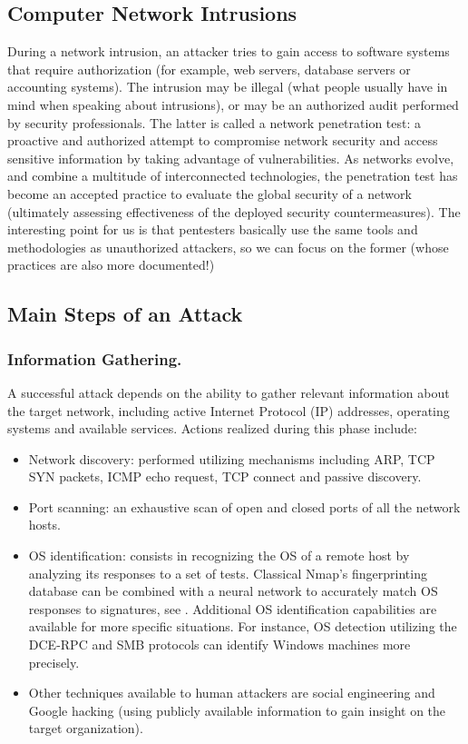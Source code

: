 \documentclass{llncs}
\begin{document}
\subsection{Computer Network Intrusions}

During a network intrusion, an attacker tries to 
gain access to software systems that require authorization
(for example, web servers, database servers or accounting systems).
The intrusion may be illegal (what people usually have in mind when 
speaking about intrusions), or may be an authorized audit performed by security professionals.
The latter is called a network penetration test: a proactive and authorized attempt to compromise 
network security and access sensitive information by taking advantage of vulnerabilities.
As networks evolve, and combine a multitude of interconnected technologies, the penetration test
has become an accepted practice to evaluate the global security of a network
(ultimately assessing effectiveness of the deployed security countermeasures).
The interesting point for us is that pentesters basically use the same tools and methodologies
as unauthorized attackers, so we can focus on the former (whose practices are also more documented!)



\subsection{Main Steps of an Attack}
\label{main_steps}

\subsubsection{Information Gathering.}

A successful attack depends on the ability to gather relevant information about the
target network,
including active Internet Protocol (IP) addresses, operating systems and available services. 
Actions realized during this phase include:
\begin{itemize}
\item{
Network discovery: performed utilizing mechanisms including ARP, TCP SYN packets, ICMP echo request, 
TCP connect and passive discovery. }
\item{
Port scanning: an exhaustive scan of open and closed ports of all the network hosts.}
\item{
OS identification: consists in recognizing the OS of a remote host by analyzing its responses to a set of tests. 
Classical Nmap's fingerprinting database can be combined with a neural network to accurately 
match OS responses to signatures, see \cite{neural_network}.
Additional OS identification capabilities are available for more specific situations. 
For instance, OS detection utilizing the DCE-RPC and SMB protocols can identify Windows machines more precisely.}
\item{Other techniques available to human attackers are social engineering and 
Google hacking (using publicly available information to gain insight on the target organization).
}
\end{itemize}
\end{document}
